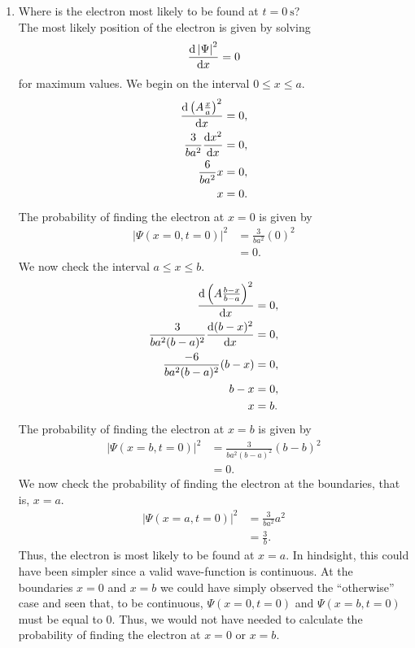 \documentclass[a4paper, 12pt]{config/homework}
\begin{document}
\begin{enumerate}
\begin{enumerate}[label=(\alph*)]
\pagebreak
\item Where is the electron most likely to be found at \(t=\qty{0}{\second}\)?
\\The most likely position of the electron is given by solving
\[\odv{\left|\Psi\right|^2}{x} = 0\]
for maximum values. We begin on the interval \(0 \le x \le a\).
\begin{align*}
\odv{\left(A \frac{x}{a}\right)^2}{x} &= 0,
\\\frac{3}{ba^2}\odv{x^2}{x} &= 0,
\\\frac{6}{ba^2} x &= 0,
\\x &= 0.
\end{align*}
The probability of finding the electron at \(x=0\) is given by
\begin{align*}
\left| \Psi(x=0,t=0) \right|^2 &= \frac{3}{ba^2} (0)^2
\\&= 0.
\end{align*}
We now check the interval \(a \le x \le b\).
\begin{align*}
\odv{\left(A \frac{b-x}{b-a}\right)^2}{x} &= 0,
\\\frac{3}{ba^2(b-a)^2}\odv{(b-x)^2}{x} &= 0,
\\\frac{-6}{ba^2(b-a)^2}(b-x) &= 0,
\\b-x &= 0,
\\x &= b.
\end{align*}
The probability of finding the electron at \(x=b\) is given by
\begin{align*}
\left| \Psi(x=b,t=0) \right|^2 &= \frac{3}{ba^2(b-a)^2}(b-b)^2
\\&= 0.
\end{align*}
We now check the probability of finding the electron at the  boundaries, that is, \(x=a\).
\begin{align*}
\left| \Psi(x=a, t=0) \right|^2 &= \frac{3}{ba^2}a^2
\\&= \frac{3}{b}.
\end{align*}
Thus, the electron is most likely to be found at \(x=a\). In hindsight, this could have been simpler since a valid wave-function is continuous. At the boundaries \(x=0\) and \(x=b\) we could have simply observed the ``otherwise'' case and seen that, to be continuous, \(\Psi(x=0,t=0)\) and \(\Psi(x=b,t=0)\) must be equal to 0. Thus, we would not have needed to calculate the probability of finding the electron at \(x=0\) or \(x=b\).


\end{enumerate}
\end{enumerate}
\end{document}
